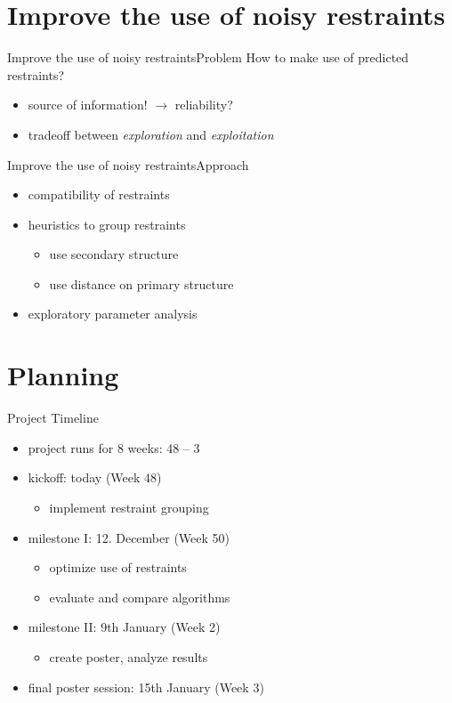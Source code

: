 \documentclass{beamer}
\begin{document}
\section{Improve the use of noisy restraints}

\begin{frame}{Improve the use of noisy restraints}{Problem}
How to make use of predicted restraints?
\begin{itemize}
    \item source of information! $\rightarrow$ reliability?
    \item tradeoff between \emph{exploration} and \emph{exploitation}
\end{itemize}
\end{frame}

\begin{frame}{Improve the use of noisy restraints}{Approach}
\begin{itemize}
    \item compatibility of restraints
    \item heuristics to group restraints
    \begin{itemize}
        \item use secondary structure
        \item use distance on primary structure
    \end{itemize}
    \item exploratory parameter analysis
\end{itemize}
\end{frame}

\section{Planning}

\begin{frame}{Project Timeline}
\begin{itemize}
\item project runs for 8 weeks: 48 -- 3
\item kickoff: today (Week 48)
    \begin{itemize}
    \item implement restraint grouping
    \end{itemize}
\item milestone I: 12. December (Week 50)
    \begin{itemize}
    \item optimize use of restraints
    \item evaluate and compare algorithms
    \end{itemize}
\item milestone II: 9th January (Week 2)
    \begin{itemize}
    \item create poster, analyze results
    \end{itemize}
\item final poster session: 15th January (Week 3)
\end{itemize}
\end{frame}
\end{document}
